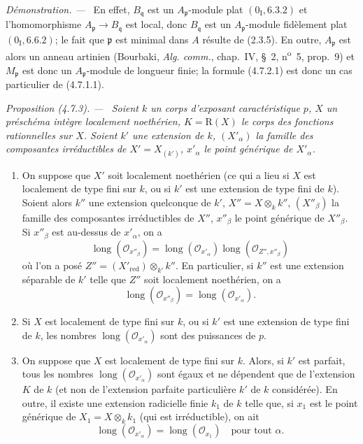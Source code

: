 \documentclass[10pt,oneside]{book}
\makeatletter
\newcommand{\oldpage}[2][]{%
  \setcounter{footnote}{0}%
  \marginpar{\scriptsize\textbf{#1}~|~#2}\ignorespaces}
\newenvironment{proposition}[1][]{%
  \par\medskip\noindent\itshape Proposition (#1). ---\ }{\par}
\newenvironment{proof}{%
  \par\medskip\noindent\textit{Démonstration. ---\ }}{\par}
\newcommand{\EGAReaderTarget}[2]{\hypertarget{#1}{}\@bsphack\begingroup\def\@currentHref{#1}\label{#2}\endgroup\@esphack}
\makeatother
\begin{document}
\begin{proof}
En effet, $B_{\mathfrak q}$ est un $A_{\mathfrak p}$-module plat
$(0_{\mathrm I},6.3.2)$ et l'homomorphisme
$A_{\mathfrak p}\to B_{\mathfrak q}$ est local, donc $B_{\mathfrak q}$ est
un $A_{\mathfrak p}$-module fidèlement plat $(0_{\mathrm I},6.6.2)$; le fait
que $\mathfrak p$ est minimal dans $A$ résulte de (2.3.5). En outre,
$A_{\mathfrak p}$ est alors un anneau artinien (Bourbaki, \emph{Alg. comm.},
chap.~IV, \S~2, n\textsuperscript{o}~5, prop.~9) et $M_{\mathfrak p}$ est donc
un $A_{\mathfrak p}$-module de longueur finie; la formule (4.7.2.1) est donc
un cas particulier de (4.7.1.1).
\end{proof}

\begin{proposition}[4.7.3]
\EGAReaderTarget{ega4.c04.prop.4-7-3}{IV.2.4.7.3-fr}
Soient $k$ un corps d'exposant caractéristique $p$, $X$ un préschéma intègre
localement noethérien, $K=\mathrm R(X)$ le corps des fonctions rationnelles
sur $X$. Soient $k'$ une extension de $k$, $(X'_\alpha)$ la famille des
composantes irréductibles de $X'=X_{(k')}$, $x'_\alpha$ le point générique de
$X'_\alpha$.
\begin{enumerate}
\item[(i)] On suppose que $X'$ soit localement noethérien (ce qui a lieu si
$X$ est localement de type fini sur $k$, ou si $k'$ est une extension de type
fini de $k$). Soient alors $k''$ une extension quelconque de $k'$,
$X''=X\otimes_k k''$, $(X''_\beta)$ la famille des composantes irréductibles
de $X''$, $x''_\beta$ le point générique de $X''_\beta$. Si $x''_\beta$ est
au-dessus de $x'_\alpha$, on a
\begin{equation}
\operatorname{long}(\mathcal O_{x''_\beta})
=\operatorname{long}(\mathcal O_{x'_\alpha})
 \operatorname{long}(\mathcal O_{Z'',x''_\beta})
\tag{4.7.3.1}
\label{IV.2.4.7.3.1-fr}
\end{equation}
où l'on a posé $Z''=(X'_{\mathrm{red}})\otimes_{k'}k''$. En particulier, si
$k''$ est une extension séparable de $k'$ telle que $Z''$ soit localement
noethérien, on a
\[
\operatorname{long}(\mathcal O_{x''_\beta})
=\operatorname{long}(\mathcal O_{x'_\alpha}).
\]

\oldpage[IV-2]{76}

\item[(ii)] Si $X$ est localement de type fini sur $k$, ou si $k'$ est une
extension de type fini de $k$, les nombres
$\operatorname{long}(\mathcal O_{x'_\alpha})$ sont des puissances de $p$.

\item[(iii)] On suppose que $X$ est localement de type fini sur $k$. Alors,
si $k'$ est parfait, tous les nombres
$\operatorname{long}(\mathcal O_{x'_\alpha})$ sont égaux et ne dépendent que
de l'extension $K$ de $k$ (et non de l'extension parfaite particulière $k'$
de $k$ considérée). En outre, il existe une extension radicielle finie $k_1$
de $k$ telle que, si $x_1$ est le point générique de
$X_1=X\otimes_k k_1$ (qui est irréductible), on ait
\[
\operatorname{long}(\mathcal O_{x'_\alpha})
=\operatorname{long}(\mathcal O_{x_1})
\quad\text{pour tout }\alpha.
\]
\end{enumerate}
\end{proposition}
\end{document}
